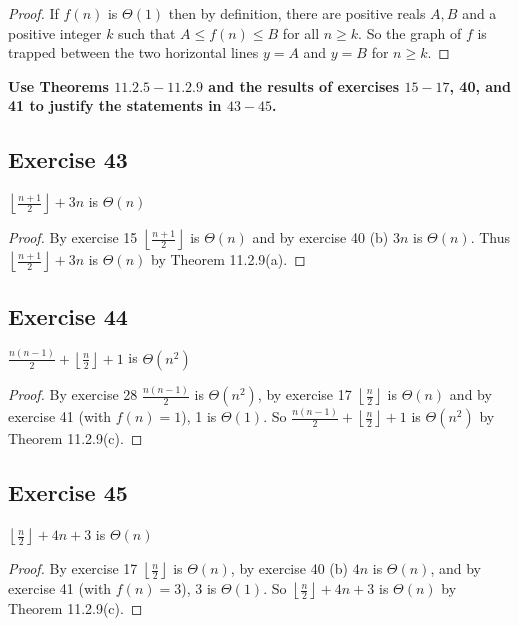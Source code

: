 \documentclass[14pt]{extarticle}
\newcommand{\dps}{\displaystyle}
\newcommand{\cy}{\color{cyan}}
\newcommand{\floor}[1]{{\left\lfloor#1\right\rfloor}}
\begin{document}
\begin{proof}
    If \(f(n)\) is \(\Theta(1)\) then by definition, there are positive reals \(A,B\) and a positive integer \(k\) such that
    \(A \leq f(n) \leq B\) for all \(n \geq k\). So the graph of \(f\) is trapped between the two horizontal lines \(y = A\) and
    \(y = B\) for \(n \geq k\).
\end{proof}

{\bf \cy Use Theorems \(11.2.5-11.2.9\) and the results of exercises \(15-17\), 40, and 41 to justify the statements in
\(43-45\).}

\subsection{Exercise 43}
\(\dps \floor{\frac{n+1}{2}} + 3n\) is \(\Theta(n)\)

\begin{proof}
    By exercise 15 \(\dps \floor{\frac{n+1}{2}}\) is \(\Theta(n)\) and by exercise 40 (b) \(3n\) is \(\Theta(n)\). Thus
    \(\dps \floor{\frac{n+1}{2}} + 3n\) is \(\Theta(n)\) by Theorem 11.2.9(a).
\end{proof}

\subsection{Exercise 44}
\(\dps \frac{n(n-1)}{2} + \floor{\frac{n}{2}} + 1\) is \(\Theta(n^2)\)

\begin{proof}
    By exercise 28 \(\dps \frac{n(n-1)}{2}\) is \(\Theta(n^2)\), by exercise 17 \(\dps \floor{\frac{n}{2}}\) is \(\Theta(n)\)
    and by exercise 41 (with \(f(n) = 1\)), 1 is \(\Theta(1)\). So \(\dps \frac{n(n-1)}{2} + \floor{\frac{n}{2}} + 1\) is
    \(\Theta(n^2)\) by Theorem 11.2.9(c).
\end{proof}

\subsection{Exercise 45}
\(\dps \floor{\frac{n}{2}} + 4n + 3\) is \(\Theta(n)\)

\begin{proof}
    By exercise 17 \(\dps \floor{\frac{n}{2}}\) is \(\Theta(n)\),
    by exercise 40 (b) \(4n\) is \(\Theta(n)\), and by exercise 41
    (with \(f(n) = 3\)), 3 is \(\Theta(1)\). So \(\dps \floor{\frac{n}{2}} + 4n + 3\) is \(\Theta(n)\) by Theorem
    11.2.9(c).
\end{proof}
\end{document}
